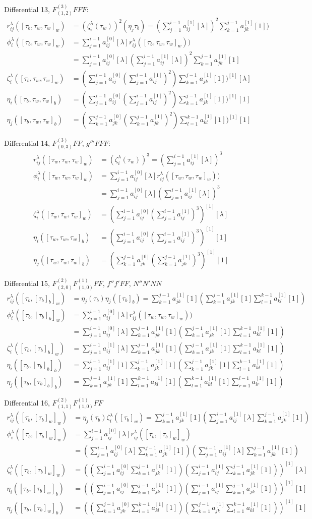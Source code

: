 \documentclass[english,unicode]{article}
\def\SiL{\sum_{j=1}^{i-1}a_{ij}^{[0]}[\lambda]}
\def\SiIL{\sum_{j=1}^{i-1}a_{ij}^{[1]}[\lambda]}
\def\Si{\sum_{j=1}^{i-1}a_{ij}^{[0]}}
\def\Sj{\sum_{k=1}^{j-1}a_{jk}^{[0]}}
\def\SiI{\sum_{j=1}^{i-1}a_{ij}^{[1]}}
\def\SjI{\sum_{k=1}^{j-1}a_{jk}^{[1]}}
\def\SiIO{\sum_{j=1}^{i-1}a_{ij}^{[1]}[1]}
\def\SjIO{\sum_{k=1}^{j-1}a_{jk}^{[1]}[1]}
\def\SkIO{\sum_{l=1}^{k-1}a_{kl}^{[1]}[1]}
\def\SlIO{\sum_{r=1}^{l-1}a_{lr}^{[1]}[1]}
\def\EIL{^{[1]}[\lambda]}
\def\EIO{^{[1]}[1]}
\begin{document}
Differential 13, $F^{(3)}_{(1,2)}FFF$:
\begin{align*}
r_{ij}^\lambda([\tau_b,\tau_w,\tau_w]_w)& =(\zeta_i^\lambda(\tau_w))^2(\eta_j\tau_b)=(\SiIL)^2\SjIO)\\
\phi_i^\lambda([\tau_b,\tau_w,\tau_w]_w) &= \SiL r_{ij}^\lambda ([\tau_b,\tau_w,\tau_w]_w))\\
&= \SiL(\SiIL)^2 \SjIO\\
\zeta_i^\lambda([\tau_b,\tau_w,\tau_w]_w) & = (\Si( \SiI)^2) \SjIO)\EIL\\
\eta_i([\tau_b,\tau_w,\tau_w]_b)& = (\Si( \SiI)^2) \SjIO)\EIO\\
\eta_j([\tau_b,\tau_w,\tau_w]_b)& = (\Sj( \SjI)^2) \SkIO)\EIO
\end{align*}

Differential  14, $F^{(3)}_{(0,3)}FF$, $g'''FFF$:
\begin{align*}
r_{ij}^\lambda([\tau_w,\tau_w,\tau_w]_w)& =(\zeta_i^\lambda(\tau_w))^3=(\SiIL)^3\\
\phi_i^\lambda([\tau_w,\tau_w,\tau_w]_w) &= \SiL r_{ij}^\lambda ([\tau_w,\tau_w,\tau_w]_w))\\
&= \SiL(\SiIL)^3 \\
\zeta_i^\lambda([\tau_w,\tau_w,\tau_w]_w) & = (\Si( \SiI)^3)\EIL \\
\eta_i([\tau_w,\tau_w,\tau_w]_b)& = (\Si (\SiI)^3)\EIO \\
\eta_j([\tau_w,\tau_w,\tau_w]_b)& = (\Sj (\SjI)^3)\EIO
\end{align*}

Differential  15, $F^{(2)}_{(2,0)}F^{(1)}_{(1,0)}FF$, $f''f'FF$, $N''N'NN$ 
\begin{align*}
r_{ij}^\lambda([\tau_b,[\tau_b]_b]_w)& =\eta_j(\tau_b)\eta_j([\tau_b]_b)=\SjIO(\SjIO \SkIO)\\
\phi_i^\lambda([\tau_b,[\tau_b]_b]_w) &= \SiL r_{ij}^\lambda ([\tau_w,\tau_w,\tau_w]_w))\\
&= \SiL\SjIO(\SjIO \SkIO) \\
\zeta_i^\lambda([\tau_b,[\tau_b]_b]_w) & =  \SiIL\SjIO (\SjIO \SkIO) \\
\eta_i([\tau_b,[\tau_b]_b]_b)& = \SiIO\SjIO(\SjIO \SkIO)\\
\eta_j([\tau_b,[\tau_b]_b]_b)& = \SjIO\SkIO(\SkIO \SlIO)
\end{align*}

Differential  16, $F^{(2)}_{(1,1)}F^{(1)}_{(1,0)}FF$
\begin{align*}
r_{ij}^\lambda([\tau_b,[\tau_b]_w]_w)& =\eta_j(\tau_b)\zeta_i^\lambda([\tau_b]_w)=\SjIO(\SiIL \SjIO)\\
\phi_i^\lambda([\tau_b,[\tau_b]_w]_w) &= \SiL r_{ij}^\lambda ([\tau_b,[\tau_b]_w]_w)\\
&= (\SiL\SjIO)(\SiIL \SjIO) \\
\zeta_i^\lambda([\tau_b,[\tau_b]_w]_w) & = ((\Si\SjIO)(\SiI \SjIO))\EIL  \\
\eta_i([\tau_b,[\tau_b]_w]_b)& =  ((\Si\SjIO)(\SiI \SjIO))\EIO\\
\eta_j([\tau_b,[\tau_b]_w]_b)& = ((\Sj\SkIO)(\SjI \SkIO))\EIO
\end{align*}
\end{document}
